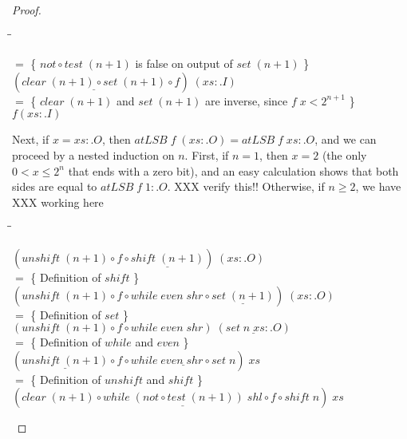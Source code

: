 \documentclass{jfp}
\newcommand{\Conid}[1]{\mathit{#1}}
\newcommand{\Varid}[1]{\mathit{#1}}
\renewcommand{\leq}{\leqslant}
\renewcommand{\geq}{\geqslant}
\newenvironment{sproof}{%
    \begin{tabbing}
    \phantom{$\equiv$} \= \qquad\qquad\qquad\qquad\qquad \= \kill
}{
    \end{tabbing}
}
\newcommand{\stmt}[1]{\> \ensuremath{#1} \\}
\newcommand{\reason}[2]{\ensuremath{#1} \>\> \{ \quad #2 \quad \} \\}
\theoremstyle{definition}
\theoremstyle{remark}
\begin{document}
\begin{proof}
\begin{sproof}
    \reason{=}{\ensuremath{not\mathbin{\circ}\Varid{test}\;(\Varid{n}\mathbin{+}\mathrm{1})} is false on output of \ensuremath{\Varid{set}\;(\Varid{n}\mathbin{+}\mathrm{1})}}
    \stmt{\ensuremath{(\underline{\Varid{clear}\;(\Varid{n}\mathbin{+}\mathrm{1})\mathbin{\circ}\Varid{set}\;(\Varid{n}\mathbin{+}\mathrm{1})}\mathbin{\circ}\Varid{f})\;(\Varid{xs}\mathrel{:\!.}\Conid{I})}}
    \reason{=}{\ensuremath{\Varid{clear}\;(\Varid{n}\mathbin{+}\mathrm{1})} and \ensuremath{\Varid{set}\;(\Varid{n}\mathbin{+}\mathrm{1})} are inverse, since $\ensuremath{\Varid{f}\;\Varid{x}} < 2^{n+1}$}
    \stmt{f (xs :. I)}
  \end{sproof}
  Next, if \ensuremath{\Varid{x}\mathrel{=}\Varid{xs}\mathrel{:\!.}\Conid{O}}, then \ensuremath{\Varid{atLSB}\;\Varid{f}\;(\Varid{xs}\mathrel{:\!.}\Conid{O})\mathrel{=}\Varid{atLSB}\;\Varid{f}\;\Varid{xs}\mathrel{:\!.}\Conid{O}},
  and we can proceed by a nested induction on $n$.  First, if $n = 1$,
  then $x = 2$ (the only $0 < x \leq 2^n$ that ends with a zero bit),
  and an easy calculation shows that both sides are equal to \ensuremath{\Varid{atLSB}\;\Varid{f}\;\mathrm{1}\mathrel{:\!.}\Conid{O}}.  XXX verify this!!   Otherwise, if $n \geq 2$, we have  XXX working here
  \begin{sproof}
    \stmt{\ensuremath{(\Varid{unshift}\;(\Varid{n}\mathbin{+}\mathrm{1})\mathbin{\circ}\Varid{f}\mathbin{\circ}\underline{\Varid{shift}\;(\Varid{n}\mathbin{+}\mathrm{1})})\;(\Varid{xs}\mathrel{:\!.}\Conid{O})}}
    \reason{=}{Definition of \ensuremath{\Varid{shift}}}
    \stmt{\ensuremath{(\Varid{unshift}\;(\Varid{n}\mathbin{+}\mathrm{1})\mathbin{\circ}\Varid{f}\mathbin{\circ}\Varid{while}\;\Varid{even}\;\Varid{shr}\mathbin{\circ}\underline{\Varid{set}\;(\Varid{n}\mathbin{+}\mathrm{1})})\;(\Varid{xs}\mathrel{:\!.}\Conid{O})}}
    \reason{=}{Definition of \ensuremath{\Varid{set}}}
    \stmt{\ensuremath{(\Varid{unshift}\;(\Varid{n}\mathbin{+}\mathrm{1})\mathbin{\circ}\Varid{f}\mathbin{\circ}\Varid{while}\;\Varid{even}\;\Varid{shr})\;(\underline{\Varid{set}\;\Varid{n}\;\Varid{xs}\mathrel{:\!.}\Conid{O}})}}
    \reason{=}{Definition of \ensuremath{\Varid{while}} and \ensuremath{\Varid{even}}}
    \stmt{\ensuremath{(\underline{\Varid{unshift}\;(\Varid{n}\mathbin{+}\mathrm{1})}\mathbin{\circ}\Varid{f}\mathbin{\circ}\underline{\Varid{while}\;\Varid{even}\;\Varid{shr}\mathbin{\circ}\Varid{set}\;\Varid{n}})\;\Varid{xs}}}
    \reason{=}{Definition of \ensuremath{\Varid{unshift}} and \ensuremath{\Varid{shift}}}
    \stmt{\ensuremath{(\Varid{clear}\;(\Varid{n}\mathbin{+}\mathrm{1})\mathbin{\circ}\underline{\Varid{while}\;(not\mathbin{\circ}\Varid{test}\;(\Varid{n}\mathbin{+}\mathrm{1}))\;\Varid{shl}}\mathbin{\circ}\Varid{f}\mathbin{\circ}\Varid{shift}\;\Varid{n})\;\Varid{xs}}}
  \end{sproof}


\end{proof}
\end{document}
